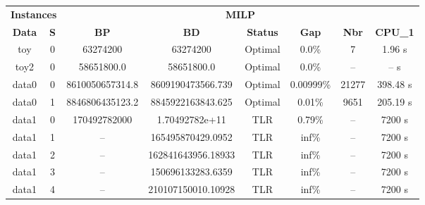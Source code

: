 \begin{table}[h!tbp]
    \centering
    \renewcommand{\arraystretch}{1.1}
    \begin{tabular}{|c|c|c|c|c|c|c|c|}
        \hline
        \multicolumn{2}{|c|}{\textbf{Instances}} & \multicolumn{6}{|c|}{\textbf{MILP}}                                                                                         \\
        \cline{1-8}
        \textbf{Data}                            & \textbf{S}                          & \textbf{BP}     & \textbf{BD}        & \textbf{Status}
                                                 & \textbf{Gap}                        & \textbf{Nbr}    & \textbf{CPU\_1}                                                     \\
        \hline
        toy                                      & 0                                   & 63274200        & 63274200           & Optimal         & 0.0\%     & 7     & 1.96 s   \\
        toy2                                     & 0                                   & 58651800.0      & 58651800.0         & Optimal         & 0.0\%     & --    & -- s     \\
        data0                                    & 0                                   & 8610050657314.8 & 8609190473566.739  & Optimal         & 0.00999\% & 21277 & 398.48 s \\
        data0                                    & 1                                   & 8846806435123.2 & 8845922163843.625  & Optimal         & 0.01\%    & 9651  & 205.19 s \\
        data1                                    & 0                                   & 170492782000    & 1.70492782e+11     & TLR             & 0.79\%    & --    & 7200 s   \\
        data1                                    & 1                                   & --              & 165495870429.0952  & TLR             & inf\%     & --    & 7200 s   \\
        data1                                    & 2                                   & --              & 162841643956.18933 & TLR             & inf\%     & --    & 7200 s   \\
        data1                                    & 3                                   & --              & 150696133283.6359  & TLR             & inf\%     & --    & 7200 s   \\
        data1                                    & 4                                   & --              & 210107150010.10928 & TLR             & inf\%     & --    & 7200 s   \\

\end{tabular}
\end{table}
